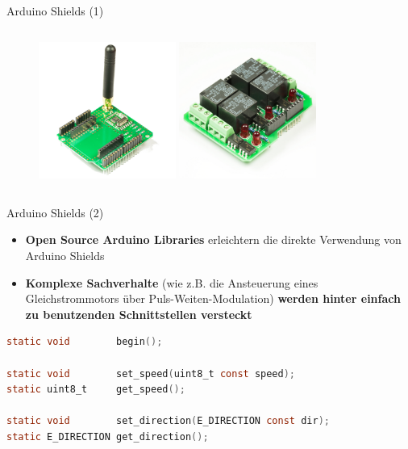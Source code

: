\documentclass{beamer}
\begin{document}
\begin{frame}{Arduino Shields (1)}
\begin{columns}
\begin{column}{0.5\textwidth}
\begin{figure}
			\includegraphics[width=0.4\textwidth]{./images/funk-shield.jpg}
			\includegraphics[width=0.4\textwidth]{./images/relais-shield.jpg}
		\end{figure}
	\end{column}
\end{columns}
\end{frame}
\begin{frame}[fragile]{Arduino Shields (2)}
\begin{itemize}
	\item \textbf{Open Source Arduino Libraries} erleichtern die direkte Verwendung von Arduino Shields 
\end{itemize}
\begin{itemize}
	\item \textbf{Komplexe Sachverhalte} (wie z.B. die Ansteuerung eines Gleichstrommotors \"uber Puls-Weiten-Modulation) \textbf{werden hinter einfach zu benutzenden Schnittstellen versteckt}
\end{itemize}
\begin{lstlisting}[frame=single, language=C]
static void        begin();

static void        set_speed(uint8_t const speed);
static uint8_t     get_speed();

static void        set_direction(E_DIRECTION const dir);
static E_DIRECTION get_direction();
\end{lstlisting}
\end{frame}
\end{document}
